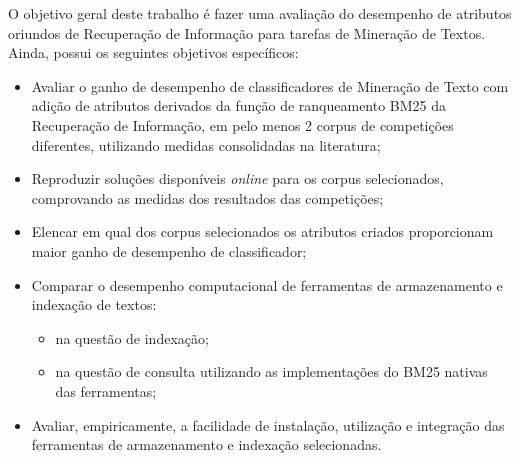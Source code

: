 
O objetivo geral deste trabalho é fazer uma avaliação do desempenho de atributos oriundos de Recuperação de Informação para tarefas de Mineração de Textos.
Ainda, possui os seguintes objetivos específicos:
\begin{itemize}
    \item Avaliar o ganho de desempenho de classificadores de Mineração de Texto com adição de atributos derivados da função de ranqueamento BM25 da Recuperação de Informação, em pelo menos 2 corpus de competições diferentes, utilizando medidas consolidadas na literatura;
    
    \item Reproduzir soluções disponíveis \textit{online} para os corpus selecionados, comprovando as medidas dos resultados das competições;
    
    \item Elencar em qual dos corpus selecionados os atributos criados proporcionam maior ganho de desempenho de classificador;
    
    \item Comparar o desempenho computacional de ferramentas de armazenamento e indexação de textos:
    \begin{itemize}
        \item na questão de indexação;
        \item na questão de consulta utilizando as implementações do BM25 nativas das ferramentas;
    \end{itemize}
    
    \item Avaliar, empiricamente, a facilidade de instalação, utilização e integração das ferramentas de armazenamento e indexação selecionadas.
\end{itemize}